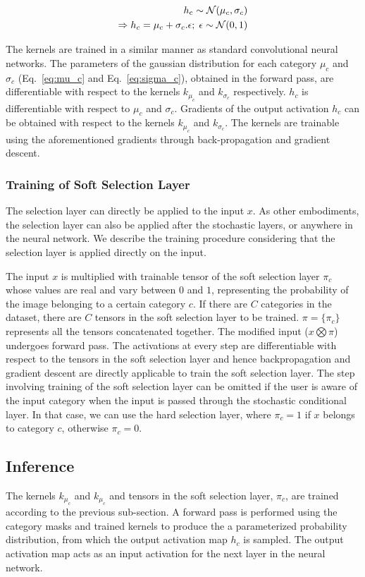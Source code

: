 \documentclass[12pt, letterpaper]{article}
\begin{document}
\begin{align}
  h_\mathrm{c} \sim \mathcal{N}(\mu_c,\sigma_c) \notag\\
  \Rightarrow h_c=\mu_c + \sigma_c.\epsilon;\; \epsilon \sim \mathcal{N}(0,1)
  \label{eq:sample}
\end{align}

The kernels are trained in a similar manner as standard convolutional neural networks. The parameters of the gaussian distribution for each category $\mu_c$ and $\sigma_c$ (Eq.~\eqref{eq:mu_c} and Eq.~\eqref{eq:sigma_c}), obtained in the forward pass, are differentiable with respect to the kernels $k_{\mu_c}$ and $k_{\sigma_c}$ respectively. $h_c$ is differentiable with respect to $\mu_c$ and $\sigma_c$. Gradients of the output activation $h_c$ can be obtained with respect to the kernels  $k_{\mu_c}$ and $k_{\sigma_c}$. The kernels are trainable using the aforementioned gradients through back-propagation and gradient descent. 

\subsubsection{Training of Soft Selection Layer}
The selection layer can directly be applied to the input $x$. As other embodiments, the selection layer can also be applied after the stochastic layers, or anywhere in the neural network. We describe the training procedure considering that the selection layer is applied directly on the input.

The input $x$ is multiplied with trainable tensor of the soft selection layer $\pi_c$ whose values are real and vary between $0$ and $1$, representing the probability of the image belonging to a certain category $c$. If there are $C$ categories in the dataset, there are $C$ tensors in the soft selection layer to be trained. $\pi=\{\pi_c\}$ represents all the tensors concatenated together. The modified input ($x \bigotimes \pi$) undergoes forward pass. The activations at every step are differentiable with respect to the tensors in the soft selection layer and hence backpropagation and gradient descent are directly applicable to train the soft selection layer.
The step involving training of the soft selection layer can be omitted if the user is aware of the input category when the input is passed through the stochastic conditional layer. In that case, we can use the hard selection layer, where $\pi_c=1$ if $x$ belongs to category $c$, otherwise $\pi_c=0$. 

\subsection{Inference}
The kernels $k_{\mu_c}$ and $k_{\mu_c}$ and tensors in the soft selection layer, $\pi_c$, are trained according to the previous sub-section. A forward pass is performed using the category masks and trained kernels to produce the a parameterized probability distribution, from which the output activation map $h_c$ is sampled. The output activation map acts as an input activation for the next layer in the neural network. 
\end{document}
